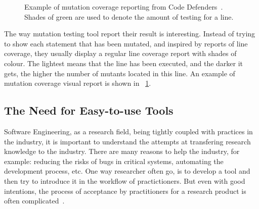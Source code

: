 \documentclass[a4paper,11pt]{sdm_internship}
\theoremstyle{definition}
\begin{document}
\begin{figure}
  \centering
  \caption{Example of mutation coverage reporting from Code Defenders\protect\footnotemark{}~\cite{rojas2017code}. Shades of green are used to denote the amount of testing for a line.}%
  \label{fig:screenshot_mutation_coverage}
\end{figure}
The way mutation testing tool report their result is interesting.
Instead of trying to show each statement that has been mutated, and inspired by reports of line coverage, they usually display a regular line coverage report with shades of colour.
The lightest means that the line has been executed, and the darker it gets, the higher the number of mutants located in this line.
An example of mutation coverage visual report is shown in \figurename~\ref{fig:screenshot_mutation_coverage}.

\subsection{The Need for Easy-to-use Tools}%
\label{ssec:need_easy}
Software Engineering, as a research field, being tightly coupled with practices in the industry, it is important to understand the attempts at transfering research knowledge to the industry.
There are many reasons to help the industry, for example: reducing the risks of bugs in critical systems, automating the development process, etc.
One way researcher often go, is to develop a tool and then try to introduce it in the workflow of practictioners.
But even with good intentions, the process of acceptance by practitioners for a research product is often complicated~\cite{delahaye2015selecting}.
\end{document}
